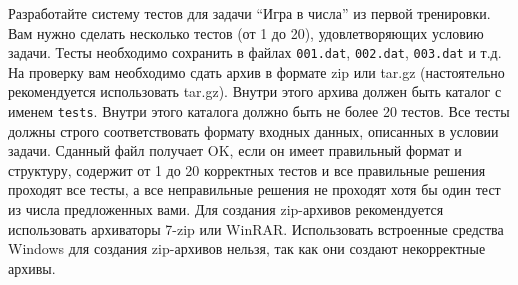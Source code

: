 \documentclass[12pt]{scrartcl}
\begin{document}
Разработайте систему тестов для задачи ``Игра в числа'' из первой тренировки.
Вам нужно сделать несколько тестов (от 1 до 20), удовлетворяющих условию задачи.
Тесты необходимо сохранить в файлах \texttt{001.dat},
\texttt{002.dat}, \texttt{003.dat} и т.д.
На проверку вам необходимо сдать архив в формате zip или tar.gz (настоятельно рекомендуется использовать tar.gz).
Внутри этого архива должен быть каталог с именем \texttt{tests}.
Внутри этого каталога должно быть не более 20 тестов.
Все тесты должны строго соответствовать формату входных данных, описанных в условии задачи.
Сданный файл получает OK, если он имеет правильный формат и структуру, содержит от 1 до 20 корректных
тестов и все правильные решения проходят все тесты,
а все неправильные решения не проходят хотя бы один тест из числа предложенных вами.
Для создания zip-архивов рекомендуется использовать архиваторы 7-zip или WinRAR.
Использовать встроенные средства Windows для создания zip-архивов нельзя,
так как они создают некорректные архивы.

\newpage
\end{document}
